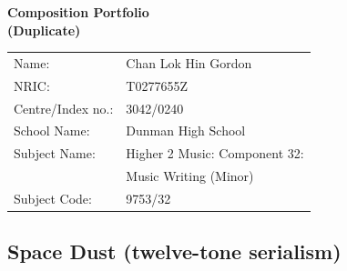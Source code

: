 \documentclass{article}
\begin{document}
\begin{center}
\vspace*{\fill}
\LARGE
    {\bf Composition Portfolio\\
    (Duplicate)}
\vspace*{\fill}
%
\end{center}
\begin{center}
    \large
\begin{tabular}{ll}
    Name: &Chan Lok Hin Gordon\\
    NRIC: &T0277655Z\\
    Centre/Index no.: &3042/0240\\
    School Name: &Dunman High School\\
    Subject Name: &Higher 2 Music: Component 32:\\
    &Music Writing (Minor)\\
    Subject Code: &9753/32
\end{tabular}
\end{center}

\newpage

\tableofcontents

\newpage

\begin{center}
\vspace*{\fill}
\LARGE
    \section{Space Dust (twelve-tone serialism)}
\vspace*{\fill}
%
\end{center}

\newpage
\end{document}
